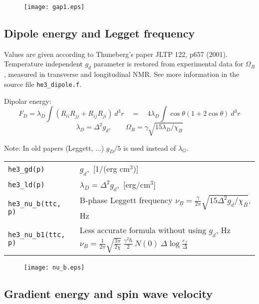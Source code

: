 \documentclass[a4paper]{article}
\begin{document}
\begin{figure}[h]
\texttt{[image: gap1.eps]}\\
\end{figure}
\eject

\subsection*{Dipole energy and Legget frequency}

Values are given according to Thuneberg's paper JLTP 122, p657 (2001).
Temperature independent $g_d$ parameter is restored from experimental
data for $\Omega_B$, measured in transverse and longitudinal NMR.
See more information in the source file {\tt he3\_dipole.f}.

Dipolar energy:
$$
F_D = \lambda_D \int (R_{ii}R_{jj}+R_{ij}R_{ji})\ d^3r
\quad =\quad 4 \lambda_D \int \cos\theta(1+2\cos\theta)\ d^3r
$$
$$
\lambda_D = \Delta^2 g_d,
\qquad \Omega_B = \gamma \sqrt{15 \lambda_D/\chi_B}
$$

Note: In old papers (Leggett, ...) $g_D/5$ is used instead of $\lambda_G$.

\medskip
\noindent\begin{tabular}{lp{11cm}}
\tt he3\_gd(p) & $g_d$,~[1/(erg cm$^3$)]\\
\tt he3\_ld(p) & $\lambda_D = \Delta^2 g_d$,~[erg/cm$^3$]\\
\tt he3\_nu\_b(ttc, p) &B-phase Leggett frequency
                             $\displaystyle \nu_B = \frac{\gamma}{2\pi}
                               \sqrt{15 \Delta^2 g_d/\chi_B}$, Hz\\

\tt he3\_nu\_b1(ttc, p)  & Less accurate formula without using $g_d$, Hz\newline
                             $\displaystyle \nu_B =\frac{1}{2\pi}\sqrt{\frac{3\pi}{2\chi}}
                             \ \frac{\gamma^2\hbar}{2}\ N(0)\ \Delta \log\frac{e_f}{\Delta}$\\
\end{tabular}
\medskip

\begin{figure}[h]
\texttt{[image: nu\_b.eps]}\\
\end{figure}

\eject
\subsection*{Gradient energy and spin wave velocity}
\end{document}
